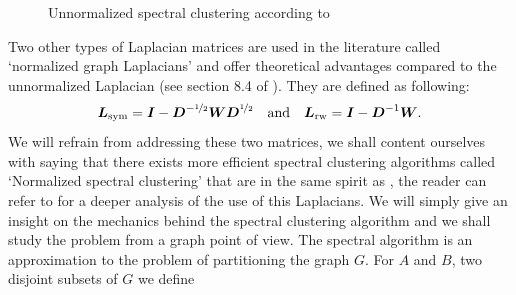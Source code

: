  \begin{figure}[h]
\begin{center}
   \caption{Unnormalized spectral clustering according to \citep{Luxburg:2007:TSC:1288822.1288832}}
   \label{algo:unnorm_spectr_alg}
\end{center}
\vspace{-15pt}
\end{figure}
Two other types of Laplacian matrices are used in the literature called `normalized graph Laplacians' and offer theoretical advantages compared to the unnormalized Laplacian (see section 8.4 of \citep{Luxburg:2007:TSC:1288822.1288832}). They are defined as following:
\begin{equation}
  \boldsymbol L_{\textnormal{sym}} = \boldsymbol I - \boldsymbol D^{-\nicefrac{1}{2}}\boldsymbol W\boldsymbol D^{\nicefrac{1}{2}} \quad \textnormal{and} \quad \boldsymbol L_{\textnormal{rw}}= \boldsymbol I-\boldsymbol D^{-1}\boldsymbol W.
\end{equation}
We will refrain from addressing these two matrices, we shall content ourselves with saying that there exists more efficient spectral clustering algorithms called `Normalized spectral clustering' that are in the same spirit as , the reader can refer to \citep{Shi:2000:NCI:351581.351611,Ng01onspectral,Luxburg:2007:TSC:1288822.1288832} for a deeper analysis of the use of this Laplacians. We will simply give an insight on the mechanics behind the spectral clustering algorithm and we shall study the problem from a graph point of view. The spectral algorithm is an approximation to the problem of partitioning the graph $G$. For $A$ and $B$, two disjoint subsets of $G$ we define
